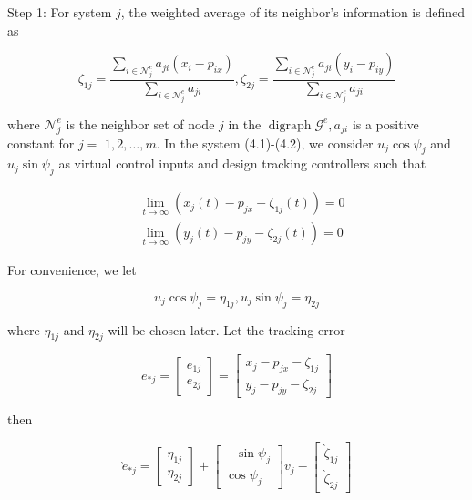 \documentclass[10pt]{article}
\begin{document}
Step 1: For system $j$, the weighted average of its neighbor's information is defined as

$$
\zeta_{1 j}=\frac{\sum_{i \in \mathcal{N}_{j}^{e}} a_{j i}\left(x_{i}-p_{i x}\right)}{\sum_{i \in \mathcal{N}_{j}^{e}} a_{j i}}, \zeta_{2 j}=\frac{\sum_{i \in \mathcal{N}_{j}^{e}} a_{j i}\left(y_{i}-p_{i y}\right)}{\sum_{i \in \mathcal{N}_{j}^{e}} a_{j i}}
$$

where $\mathcal{N}_{j}^{e}$ is the neighbor set of node $j$ in the $\operatorname{digraph} \mathcal{G}^{e}, a_{j i}$ is a positive constant for $j=$ $1,2, \ldots, m$. In the system (4.1)-(4.2), we consider $u_{j} \cos \psi_{j}$ and $u_{j} \sin \psi_{j}$ as virtual control inputs and design tracking controllers such that

$$
\begin{aligned}
& \lim _{t \rightarrow \infty}\left(x_{j}(t)-p_{j x}-\zeta_{1 j}(t)\right)=0 \\
& \lim _{t \rightarrow \infty}\left(y_{j}(t)-p_{j y}-\zeta_{2 j}(t)\right)=0
\end{aligned}
$$

For convenience, we let

$$
u_{j} \cos \psi_{j}=\eta_{1 j}, u_{j} \sin \psi_{j}=\eta_{2 j}
$$

where $\eta_{1 j}$ and $\eta_{2 j}$ will be chosen later. Let the tracking error

$$
e_{* j}=\left[\begin{array}{l}
e_{1 j} \\
e_{2 j}
\end{array}\right]=\left[\begin{array}{l}
x_{j}-p_{j x}-\zeta_{1 j} \\
y_{j}-p_{j y}-\zeta_{2 j}
\end{array}\right]
$$

then

$$
\grave{e}_{* j}=\left[\begin{array}{l}
\eta_{1 j} \\
\eta_{2 j}
\end{array}\right]+\left[\begin{array}{c}
-\sin \psi_{j} \\
\cos \psi_{j}
\end{array}\right] v_{j}-\left[\begin{array}{c}
\grave{\zeta}_{1 j} \\
\grave{\zeta}_{2 j}
\end{array}\right]
$$
\end{document}
